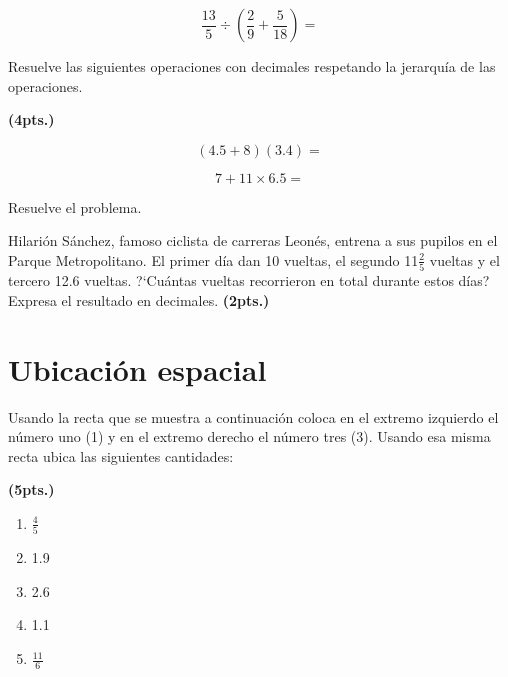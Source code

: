 \documentclass[11pt]{article}
\begin{document}
\vspace{1.5cm}

\begin{equation*}
\frac{13}{5} \div \left( \frac{2}{9} + \frac{5}{18} \right) = 
\end{equation*}

\vspace{1.5cm}

Resuelve las siguientes operaciones con decimales respetando la jerarqu\'ia de
las operaciones. 

\hfill \textbf{(4pts.)}
\begin{multicols}{2}
\begin{equation*}
(4.5 + 8)(3.4) = 
\end{equation*}

\begin{equation*}
7 + 11 \times 6.5 = 
\end{equation*}
\end{multicols}

\vspace{5cm}

Resuelve el problema. 

Hilari\'on S\'anchez, famoso ciclista de carreras Leon\'es, entrena a sus
pupilos en el Parque Metropolitano. El primer d\'ia dan 10 vueltas, el segundo
11$\frac{2}{5}$ vueltas y el tercero 12.6 vueltas. ?`Cu\'antas vueltas
recorrieron en total durante estos d\'ias? Expresa el resultado en decimales.
\hfill \textbf{(2pts.)}

\vspace{4cm}

\section{Ubicaci\'on espacial}

Usando la recta que se muestra a continuaci\'on coloca en el extremo izquierdo
el n\'umero uno (1) y en el extremo derecho el n\'umero tres (3). Usando esa
misma recta ubica las siguientes cantidades: 

\hfill \textbf{(5pts.)}

\begin{multicols}{5}
\begin{enumerate}[label=\alph*)] \itemsep-.3em
\item $\displaystyle\frac{4}{5} $ \hspace{5mm} 
\item 1.9 
\item 2.6 
\item 1.1
\item $\displaystyle\frac{11}{6} $
\end{enumerate}
\end{multicols}
\end{document}
